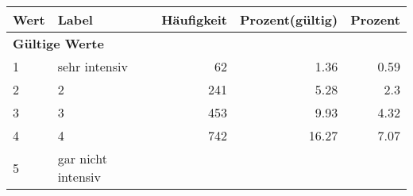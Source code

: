      \begin{longtable}{lXrrr}
     \toprule
     \textbf{Wert} & \textbf{Label} & \textbf{Häufigkeit} & \textbf{Prozent(gültig)} & \textbf{Prozent} \\
     \endhead
     \midrule
     \multicolumn{5}{l}{\textbf{Gültige Werte}}\\

     1 &
     \multicolumn{1}{X}{ sehr intensiv   } &


       \num{62} &
       \num[round-mode=places,round-precision=2]{1,36} &
         \num[round-mode=places,round-precision=2]{0,59} \\

     2 &
     \multicolumn{1}{X}{ 2   } &


       \num{241} &
       \num[round-mode=places,round-precision=2]{5,28} &
         \num[round-mode=places,round-precision=2]{2,3} \\

     3 &
     \multicolumn{1}{X}{ 3   } &


       \num{453} &
       \num[round-mode=places,round-precision=2]{9,93} &
         \num[round-mode=places,round-precision=2]{4,32} \\

     4 &
     \multicolumn{1}{X}{ 4   } &


       \num{742} &
       \num[round-mode=places,round-precision=2]{16,27} &
         \num[round-mode=places,round-precision=2]{7,07} \\

     5 &
     \multicolumn{1}{X}{ gar nicht intensiv   } &



\end{longtable}
